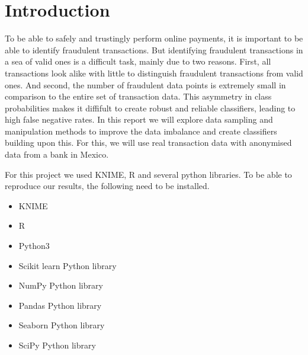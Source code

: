 \section*{Introduction}

To be able to safely and trustingly perform online payments, it is important to be able to identify fraudulent transactions. But identifying fraudulent transactions in a sea of valid ones is a difficult task, mainly due to two reasons. First, all transactions look alike with little to distinguish fraudulent transactions from valid ones. And second, the number of fraudulent data points is extremely small in comparison to the entire set of transaction data. This asymmetry in class probabilities makes it diffifult to create robust and reliable classifiers, leading to high false negative rates. In this report we will explore data sampling and manipulation methods to improve the data imbalance and create classifiers building upon this. For this, we will use real transaction data with anonymised data from a bank in Mexico.

For this project we used KNIME, R and several python libraries. To be able to reproduce our results, the following need to be installed.

\begin{itemize}
	\setlength\itemsep{0.05em}
	\item KNIME
	\item R
	\item Python3
	\item Scikit learn Python library
	\item NumPy Python library
	\item Pandas Python library
	\item Seaborn Python library
	\item SciPy Python library
\end{itemize}
